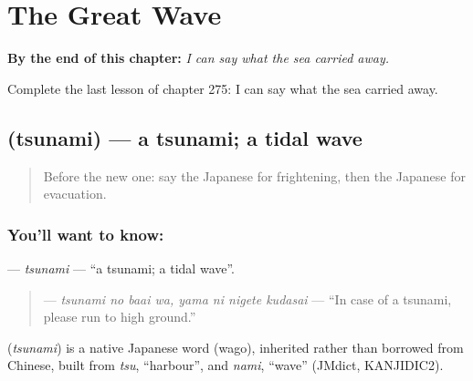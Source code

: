 
\chapter{The Great Wave}
\label{ch:ja-the-great-wave}

\begin{chapteropening}
\textbf{By the end of this chapter:} \emph{I can say what the sea carried away.}

Complete the last lesson of chapter 275: I can say what the sea carried away.
\end{chapteropening}

\section[\texorpdfstring{\ja{つなみ} (tsunami)}{つなみ (tsunami)}]{ (tsunami) — a tsunami; a tidal wave}

\label{lesson:JA-C275-tsunami}



\begin{quote}
Before the new one: say the Japanese for frightening, then the Japanese for evacuation.
\end{quote}

\subsection*{You'll want to know: }
\textbf{} — \emph{tsunami} — \textquotedblleft{}a tsunami; a tidal wave\textquotedblright{}.

\begin{quote}
\textbf{   } — \emph{tsunami no baai wa, yama ni nigete kudasai} — \textquotedblleft{}In case of a tsunami, please run to high ground.\textquotedblright{}
\end{quote}

\begin{cousinweb}
\textbf{} (\emph{tsunami}) is a native Japanese word (wago), inherited rather than borrowed from Chinese, built from \emph{tsu}, \textquotedblleft{}harbour\textquotedblright{}, and \emph{nami}, \textquotedblleft{}wave\textquotedblright{} (JMdict, KANJIDIC2).
\end{cousinweb}

